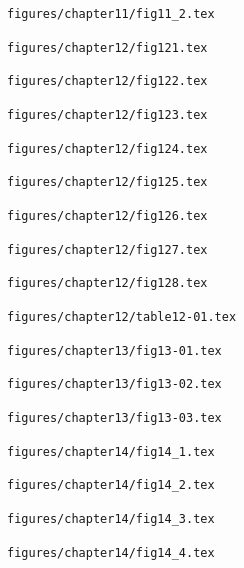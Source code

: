 \documentclass[11pt,a4paper]{article}
\begin{document}
\clearpage
\noindent\texttt{figures/chapter11/fig11\_2.tex}


\clearpage
\noindent\texttt{figures/chapter12/fig121.tex}


\clearpage
\noindent\texttt{figures/chapter12/fig122.tex}


\clearpage
\noindent\texttt{figures/chapter12/fig123.tex}


\clearpage
\noindent\texttt{figures/chapter12/fig124.tex}


\clearpage
\noindent\texttt{figures/chapter12/fig125.tex}


\clearpage
\noindent\texttt{figures/chapter12/fig126.tex}


\clearpage
\noindent\texttt{figures/chapter12/fig127.tex}


\clearpage
\noindent\texttt{figures/chapter12/fig128.tex}


\clearpage
\noindent\texttt{figures/chapter12/table12-01.tex}


\clearpage
\noindent\texttt{figures/chapter13/fig13-01.tex}


\clearpage
\noindent\texttt{figures/chapter13/fig13-02.tex}


\clearpage
\noindent\texttt{figures/chapter13/fig13-03.tex}


\clearpage
\noindent\texttt{figures/chapter14/fig14\_1.tex}


\clearpage
\noindent\texttt{figures/chapter14/fig14\_2.tex}


\clearpage
\noindent\texttt{figures/chapter14/fig14\_3.tex}


\clearpage
\noindent\texttt{figures/chapter14/fig14\_4.tex}

\end{document}
